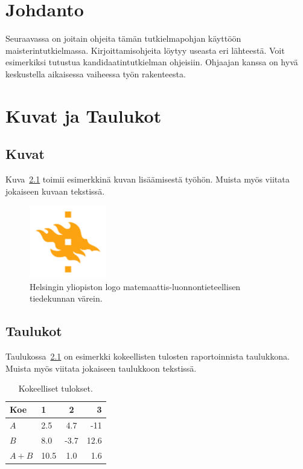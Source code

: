 \chapter{Johdanto}

Seuraavassa on joitain ohjeita tämän tutkielmapohjan käyttöön maisterintutkielmassa. Kirjoittamisohjeita löytyy useasta eri lähteestä. Voit esimerkiksi tutustua kandidaatintutkielman ohjeisiin. 
Ohjaajan kanssa on hyvä keskustella aikaisessa vaiheessa työn rakenteesta.

\chapter{Kuvat ja Taulukot}

\section{Kuvat}
Kuva~\ref{fig:logo} toimii esimerkkinä kuvan lisäämisestä työhön. Muista myös viitata jokaiseen kuvaan tekstissä. 

\begin{figure}[h!] %
\centering 
\includegraphics[width=0.3\textwidth]{HY-logo-ml.png}
\caption{Helsingin yliopiston logo matemaattis-luonnontieteellisen tiedekunnan värein.\label{fig:logo}}
\end{figure}

\section{Taulukot}

Taulukossa~\ref{table:results} on esimerkki kokeellisten tulosten raportoinnista taulukkona. Muista myös viitata jokaiseen taulukkoon tekstissä.

\begin{table}[h!]
\centering
\caption{Kokeelliset tulokset.\label{table:results}}
\begin{tabular}{l||l c r} 
Koe & 1 & 2 & 3 \\ 
\hline \hline 
$A$ & 2.5 & 4.7 & -11 \\
$B$ & 8.0 & -3.7 & 12.6 \\
$A+B$ & 10.5 & 1.0 & 1.6 \\
\hline
%
\end{tabular}
\end{table}

